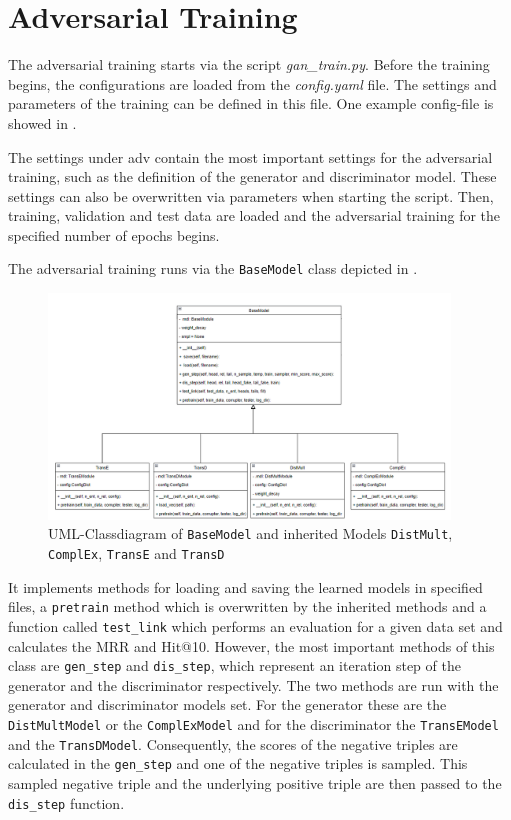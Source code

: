 \section{Adversarial Training}
\label{sec:adv_training}

The adversarial training starts via the script \textit{gan\_train.py}.
Before the training begins, the configurations are loaded from the \textit{config.yaml} file.
The settings and parameters of the training can be defined in this file.
One example config-file is showed in .

The settings under adv contain the most important settings for the adversarial training, such as the definition of the generator and discriminator model.
These settings can also be overwritten via parameters when starting the script.
Then, training, validation and test data are loaded and the adversarial training for the specified number of epochs begins.

The adversarial training runs via the \texttt{BaseModel} class depicted in .
\begin{figure}[t]
  \centering
    \includegraphics[width=0.95\textwidth]{figures/BaseModel.png}
  \caption{\ac{UML}-Classdiagram of \texttt{BaseModel} and inherited Models  \texttt{DistMult},  \texttt{ComplEx},  \texttt{TransE} and  \texttt{TransD}}
  \label{fig:basemodel_classdiagram}
\end{figure}
It implements methods for loading and saving the learned models in specified files, a \texttt{pretrain} method which is overwritten by the inherited methods and a function called \texttt{test\_link} which performs an evaluation for a given data set and calculates the MRR and Hit@10.
However, the most important methods of this class are \texttt{gen\_step} and \texttt{dis\_step}, which represent an iteration step of the generator and the discriminator respectively.
The two methods are run with the generator and discriminator models set.
For the generator these are the \texttt{DistMultModel} or the \texttt{ComplExModel} and for the discriminator the \texttt{TransEModel} and the \texttt{TransDModel}.
Consequently, the scores of the negative triples are calculated in the \texttt{gen\_step} and one of the negative triples is sampled.
This sampled negative triple and the underlying positive triple are then passed to the \texttt{dis\_step} function.

